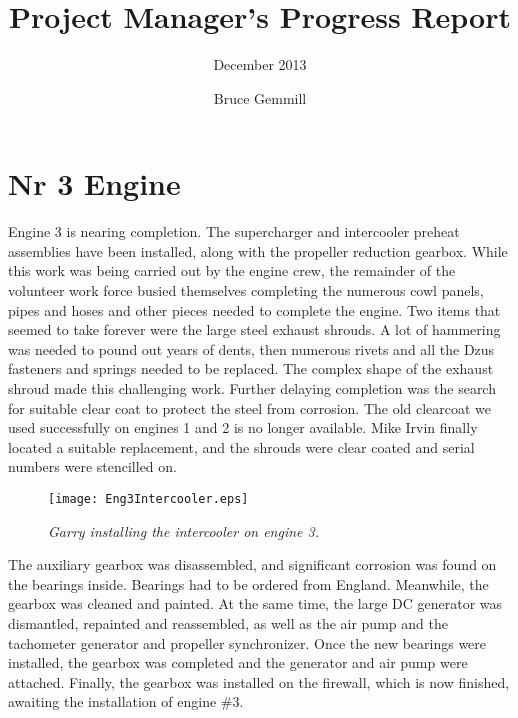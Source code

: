 %


\title{Project Manager's Progress Report}
\subtitle{December 2013}
\author{Bruce Gemmill}

\maketitle

\section{Nr 3 Engine}
\label{sec:engines_3}

Engine 3 is nearing completion.  The supercharger and intercooler
preheat assemblies have been installed, along with the propeller
reduction gearbox.  While this work was being carried out by the
engine crew, the remainder of the volunteer work force busied
themselves completing the numerous cowl panels, pipes and hoses and
other pieces needed to complete the engine.  Two items that seemed to
take forever were the large steel exhaust shrouds.  A lot of hammering
was needed to pound out years of dents, then numerous rivets and all
the Dzus fasteners and springs needed to be replaced.  The complex
shape of the exhaust shroud made this challenging work.  Further
delaying completion was the search for suitable clear coat to protect
the steel from corrosion.  The old clearcoat we used successfully on
engines 1 and 2 is no longer available.  Mike Irvin finally located a
suitable replacement, and the shrouds were clear coated and serial
numbers were stencilled on.

\begin{figure}[htbp]
   \vspace{2em}
   \centering
   \texttt{[image: Eng3Intercooler.eps]}
   \caption*{\small \em Garry installing the intercooler on engine 3.}
   \label{fig:Eng3Intercooler}
\end{figure}

The auxiliary gearbox was disassembled, and significant corrosion was
found on the bearings inside.  Bearings had to be ordered from
England.  Meanwhile, the gearbox was cleaned and painted.  At the same
time, the large DC generator was dismantled, repainted and
reassembled, as well as the air pump and the tachometer generator and
propeller synchronizer.  Once the new bearings were installed, the
gearbox was completed and the generator and air pump were attached.
Finally, the gearbox was installed on the firewall, which is now
finished, awaiting the installation of engine \#3.


